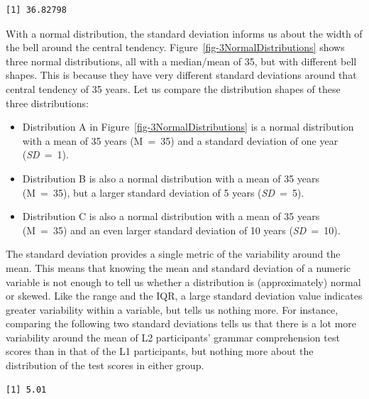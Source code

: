 \documentclass[
  letterpaper,
  DIV=11,
  numbers=noendperiod]{scrreprt}
\newenvironment{Shaded}{\begin{snugshade}}{\end{snugshade}}
\newcommand{\AttributeTok}[1]{\textcolor[rgb]{0.40,0.45,0.13}{#1}}
\newcommand{\DecValTok}[1]{\textcolor[rgb]{0.68,0.00,0.00}{#1}}
\newcommand{\FunctionTok}[1]{\textcolor[rgb]{0.28,0.35,0.67}{#1}}
\newcommand{\NormalTok}[1]{\textcolor[rgb]{0.00,0.23,0.31}{#1}}
\newcommand{\SpecialCharTok}[1]{\textcolor[rgb]{0.37,0.37,0.37}{#1}}
\providecommand{\tightlist}{%
  \setlength{\itemsep}{0pt}\setlength{\parskip}{0pt}}
\begin{document}
\begin{verbatim}
[1] 36.82798
\end{verbatim}

With a normal distribution, the standard deviation informs us about the
width of the bell around the central tendency.
Figure~\ref{fig-3NormalDistributions} shows three normal distributions,
all with a median/mean of 35, but with different bell shapes. This is
because they have very different standard deviations around that central
tendency of 35 years. Let us compare the distribution shapes of these
three distributions:

\begin{itemize}
\tightlist
\item
  Distribution A in Figure~\ref{fig-3NormalDistributions} is a normal
  distribution with a mean of 35 years (M~=~35) and a standard deviation
  of one year (\emph{SD}~=~1).
\item
  Distribution B is also a normal distribution with a mean of 35 years
  (M~=~35), but a larger standard deviation of 5 years (\emph{SD}~=~5).
\item
  Distribution C is also a normal distribution with a mean of 35 years
  (M~=~35) and an even larger standard deviation of 10 years
  (\emph{SD}~=~10).
\end{itemize}

The standard deviation provides a single metric of the variability
around the mean. This means that knowing the mean and standard deviation
of a numeric variable is not enough to tell us whether a distribution is
(approximately) normal or skewed. Like the range and the IQR, a large
standard deviation value indicates greater variability within a
variable, but tells us nothing more. For instance, comparing the
following two standard deviations tells us that there is a lot more
variability around the mean of L2 participants' grammar comprehension
test scores than in that of the L1 participants, but nothing more about
the distribution of the test scores in either group.

\begin{Shaded}
\end{Shaded}

\begin{verbatim}
[1] 5.01
\end{verbatim}
\end{document}
